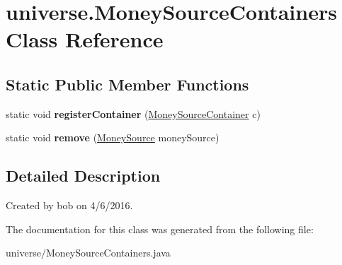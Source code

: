 \hypertarget{classuniverse_1_1_money_source_containers}{}\section{universe.\+Money\+Source\+Containers Class Reference}
\label{classuniverse_1_1_money_source_containers}
\subsection*{Static Public Member Functions}
\begin{DoxyCompactItemize}
\item 
static void {\bfseries register\+Container} (\hyperlink{interfaceuniverse_1_1_money_source_container}{Money\+Source\+Container} c)\hypertarget{classuniverse_1_1_money_source_containers_aa02077470651a4db9350deabb7d0cbe0}{}\label{classuniverse_1_1_money_source_containers_aa02077470651a4db9350deabb7d0cbe0}

\item 
static void {\bfseries remove} (\hyperlink{classuniverse_1_1_money_source}{Money\+Source} money\+Source)\hypertarget{classuniverse_1_1_money_source_containers_a8a7036e4cd95b79226475d9af7285dde}{}\label{classuniverse_1_1_money_source_containers_a8a7036e4cd95b79226475d9af7285dde}

\end{DoxyCompactItemize}


\subsection{Detailed Description}
Created by bob on 4/6/2016. 

The documentation for this class was generated from the following file\+:\begin{DoxyCompactItemize}
\item 
universe/Money\+Source\+Containers.\+java\end{DoxyCompactItemize}

